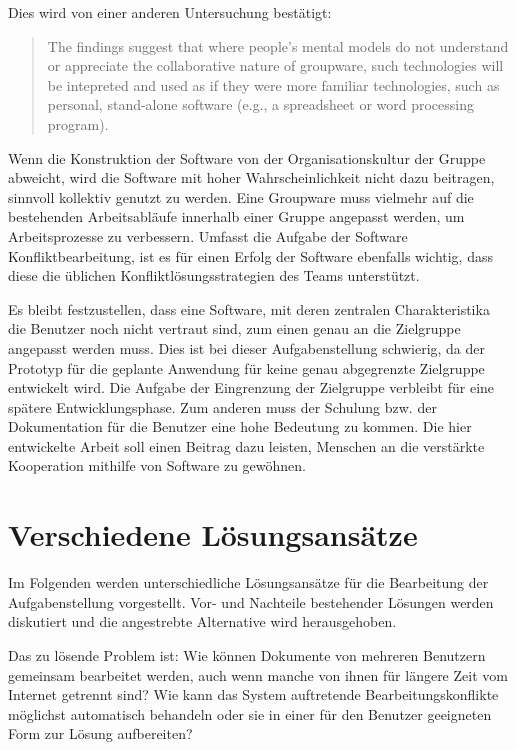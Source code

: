 Dies wird von einer anderen Untersuchung bestätigt:

\begin{quote}
The findings suggest that where people's mental models do not understand or appreciate the collaborative nature of groupware, such technologies will be intepreted and used as if they were more familiar technologies, such as personal, stand-alone software (e.g., a spreadsheet or word processing program). 
\end{quote}

Wenn die Konstruktion der Software von der Organisationskultur der Gruppe abweicht, wird die Software mit hoher Wahrscheinlichkeit nicht dazu beitragen, sinnvoll kollektiv genutzt zu werden. Eine Groupware muss vielmehr auf die bestehenden Arbeitsabläufe innerhalb einer Gruppe angepasst werden, um Arbeitsprozesse zu verbessern. Umfasst die Aufgabe der Software Konfliktbearbeitung, ist es für einen Erfolg der Software ebenfalls wichtig, dass diese die üblichen Konfliktlösungsstrategien des Teams unterstützt. 

Es bleibt festzustellen, dass eine Software, mit deren zentralen Charakteristika die Benutzer noch nicht vertraut sind, zum einen genau an die Zielgruppe angepasst werden muss. Dies ist bei dieser Aufgabenstellung schwierig, da der Prototyp für die geplante Anwendung für keine genau abgegrenzte Zielgruppe entwickelt wird. Die Aufgabe der Eingrenzung der Zielgruppe verbleibt für eine spätere Entwicklungsphase. Zum anderen muss der Schulung bzw. der Dokumentation für die Benutzer eine hohe Bedeutung zu kommen. Die hier entwickelte Arbeit soll einen Beitrag dazu leisten, Menschen an die verstärkte Kooperation mithilfe von Software zu gewöhnen.


\section{Verschiedene Lösungsansätze}

Im Folgenden werden unterschiedliche Lösungsansätze für die Bearbeitung der Aufgabenstellung vorgestellt. Vor- und Nachteile bestehender Lösungen werden diskutiert und die angestrebte Alternative wird herausgehoben.

Das zu lösende Problem ist: Wie können Dokumente von mehreren Benutzern gemeinsam bearbeitet werden, auch wenn manche von ihnen für längere Zeit vom Internet getrennt sind? Wie kann das System auftretende Bearbeitungskonflikte möglichst automatisch behandeln oder sie in einer für den Benutzer geeigneten Form zur Lösung aufbereiten?

